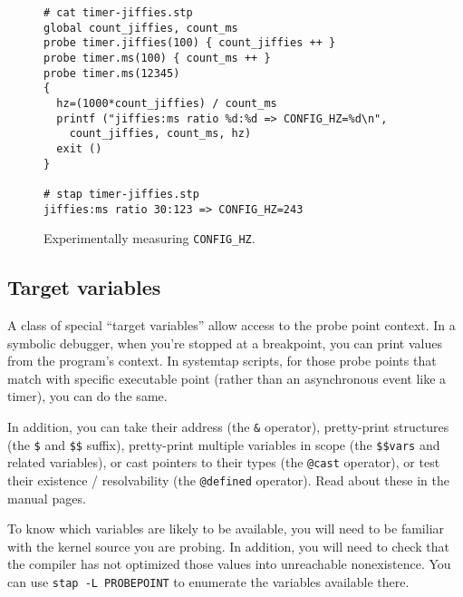 \documentclass{article}
\newenvironment{boxedminipage}%
    {\begin{makeimage}\begin{center}\begin{Sbox}\begin{minipage}}%
    {\end{minipage}\end{Sbox}\fbox{\TheSbox}\end{center}\end{makeimage}}
\renewcommand{\nomenclature}[2]{}
\begin{document}
\begin{figure}[!ht]
\begin{boxedminipage}{4.5in}
\begin{verbatim}
# cat timer-jiffies.stp
global count_jiffies, count_ms
probe timer.jiffies(100) { count_jiffies ++ }
probe timer.ms(100) { count_ms ++ }
probe timer.ms(12345) 
{
  hz=(1000*count_jiffies) / count_ms
  printf ("jiffies:ms ratio %d:%d => CONFIG_HZ=%d\n",
    count_jiffies, count_ms, hz)
  exit ()
}

# stap timer-jiffies.stp
jiffies:ms ratio 30:123 => CONFIG_HZ=243
\end{verbatim}
\end{boxedminipage}
\caption{Experimentally measuring {\tt CONFIG\_HZ}.}
\label{fig:timer-jiffies}
\end{figure}

\subsection{Target variables}

A class of special ``target variables'' allow access to the probe
point context.  \nomenclature{target variable}{A value that may be
extracted from the kernel context of the probe point, such as a
parameter or local variable within a probed function.}  In a symbolic
debugger, when you're stopped at a breakpoint, you can print values
from the program's context.  In systemtap scripts, for those probe
points that match with specific executable point (rather than an
asynchronous event like a timer), you can do the same.

In addition, you can take their address (the \verb+&+ operator),
pretty-print structures (the \verb+$+ and \verb+$$+ suffix),
pretty-print multiple variables in scope (the \verb+$$vars+ and
related variables), or cast pointers to their types (the \verb+@cast+
operator), or test their existence / resolvability (the
\verb+@defined+ operator).  Read about these in the manual pages.

To know which variables are likely to be available, you will need to
be familiar with the kernel source you are probing.  In addition, you
will need to check that the compiler has not optimized those values
into unreachable nonexistence.  You can use
\verb+stap -L PROBEPOINT+ to enumerate the variables available there.
\end{document}
